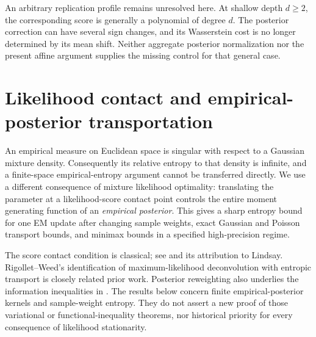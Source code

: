 \documentclass[11pt,a4paper]{article}
\theoremstyle{definition}
\theoremstyle{remark}
\numberwithin{equation}{section}
\begin{document}
An arbitrary replication profile remains unresolved here.  At shallow depth
$d\ge2$, the corresponding score is generally a polynomial of degree $d$.
The posterior correction can have several sign changes, and its Wasserstein
cost is no longer determined by its mean shift.  Neither aggregate posterior
normalization nor the present affine argument supplies the missing control
for that general case.



\section{Likelihood contact and empirical-posterior transportation}
\label{p3:cm:sec}

An empirical measure on Euclidean space is singular with respect to a
Gaussian mixture density.  Consequently its relative entropy to that
density is infinite, and a finite-space empirical-entropy argument cannot
be transferred directly.  We use a different consequence of mixture
likelihood optimality: translating the parameter at a likelihood-score
contact point controls the entire moment generating function of an
\emph{empirical posterior}.  This gives a sharp entropy bound for one
EM update after changing sample weights, exact Gaussian and Poisson
transport bounds, and minimax bounds in a specified high-precision regime.

The score contact condition is classical; see
\cite[Proposition~1.1]{p5:GG_PS2025} and its attribution to Lindsay.
Rigollet--Weed's identification of maximum-likelihood deconvolution with
entropic transport \cite[Theorem~4.2]{p3:cm:RW2018} is closely related prior
work.  Posterior reweighting also underlies the information inequalities
in \cite[Theorems~3.1 and~3.3]{p3:cm:NW2026}.  The results below concern
finite empirical-posterior kernels and sample-weight entropy.  They do
not assert a new proof of those variational or functional-inequality
theorems, nor historical priority for every consequence of likelihood
stationarity.
\end{document}
